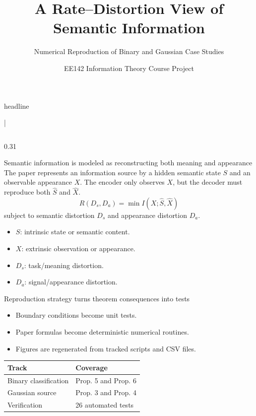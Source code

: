 \documentclass[final]{beamer}
\title{A Rate--Distortion View of Semantic Information}
\subtitle{Numerical Reproduction of Binary and Gaussian Case Studies}
\author{EE142 Information Theory Course Project}
\institute{ShanghaiTech University}
\newcommand{\sordf}{R(D_s,D_a)}
\begin{document}
\begin{frame}[t]

\begin{beamercolorbox}[wd=\paperwidth,sep=1.0cm,center]{headline}
  {\Huge\bfseries \inserttitle}\par\vspace{0.10cm}
  {\Large \insertsubtitle}\par\vspace{0.08cm}
  {\large \insertauthor \quad | \quad \insertinstitute}
\end{beamercolorbox}

\vspace{0.35cm}
\begin{columns}[t,totalwidth=0.96\paperwidth]

\begin{column}{0.31\paperwidth}
\begin{block}{Semantic information is modeled as reconstructing both meaning and appearance}
\justifying
The paper represents an information source by a hidden semantic state $S$ and an observable appearance $X$. The encoder only observes $X$, but the decoder must reproduce both $\hat S$ and $\hat X$.
\[
\sordf = \min I(X;\hat S,\hat X)
\]
subject to semantic distortion $D_s$ and appearance distortion $D_a$.

\vspace{0.12cm}
\begin{itemize}
  \item $S$: intrinsic state or semantic content.
  \item $X$: extrinsic observation or appearance.
  \item $D_s$: task/meaning distortion.
  \item $D_a$: signal/appearance distortion.
\end{itemize}
\end{block}

\begin{alertblock}{Reproduction strategy turns theorem consequences into tests}
\begin{itemize}
  \item Boundary conditions become unit tests.
  \item Paper formulas become deterministic numerical routines.
  \item Figures are regenerated from tracked scripts and CSV files.
\end{itemize}
\vspace{0.10cm}
\begin{center}
\begin{tabular}{ll}
\toprule
Track & Coverage \\
\midrule
Binary classification & Prop. 5 and Prop. 6 \\
Gaussian source & Prop. 3 and Prop. 4 \\
Verification & 26 automated tests \\
\bottomrule
\end{tabular}
\end{center}
\end{alertblock}


\end{column}
\end{columns}
\end{frame}
\end{document}

